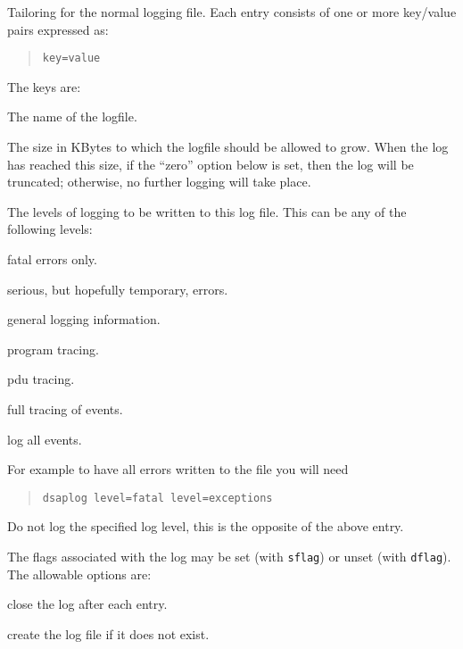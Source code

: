 \begin{describe}
\item [\verb"dsaplog":]
Tailoring for the normal logging file.
Each entry consists of one or more key/value pairs expressed as:
\begin{quote}\small\begin{verbatim}
key=value
\end{verbatim}\end{quote}
The keys are:
\begin{describe}
\item [\verb"file":]
The name of the logfile.
\item [\verb"size":]
The size in KBytes to which the logfile should be allowed to grow.
When the log has reached this size, if the ``zero'' option
below is set, then the log will be truncated; otherwise, no further
logging will take place.
\item [\verb"level":]
The levels of logging to be written to this log file.
This can be any of the following levels:
\begin{describe}
\item [\verb"fatal":]
fatal errors only.
\item [\verb"exceptions":]
serious, but hopefully temporary, errors.
\item [\verb"notice":]
general logging information.
\item [\verb"trace":]
program tracing.
\item [\verb"pdus":]
pdu tracing.
\item [\verb"debug":]
full tracing of events.
\item [\verb"all":]
log all events.
\end{describe}
For example to have all errors written to the file you will need
\begin{quote}\footnotesize\begin{verbatim}
dsaplog level=fatal level=exceptions
\end{verbatim}\end{quote}
\item [\verb"dlevel":]
Do not log the specified log level, this is the opposite of the above
entry.
\item [\verb"dflags"/\verb"sflags":]
The flags associated with the log may be set (with \verb"sflag")
or unset (with \verb"dflag"). The allowable options are:
\begin{describe}
\item [\verb"close":]
close the log after each entry.
\item [\verb"create":]
create the log file if it does not exist.

\end{describe}
\end{describe}
\end{describe}
